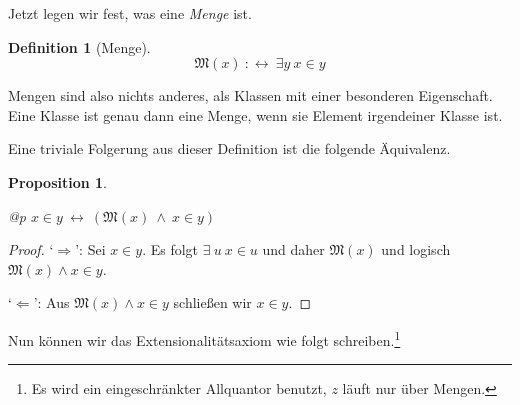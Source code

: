 \documentclass[a4paper,german,10pt,twoside]{book}
\newtheorem{prop}[thm]{Proposition}
\theoremstyle{definition}
\newtheorem{defn}[thm]{Definition}
\theoremstyle{remark}
\begin{document}
\par
Jetzt legen wir fest, was eine \emph{Menge} ist.

\begin{defn}[Menge]
\label{definition:isSet} \hypertarget{definition:isSet}{}
$$\mathfrak{M}(x)\ :\leftrightarrow \ \exists y\ x \in y$$

\end{defn}

Mengen sind also nichts anderes, als Klassen mit einer besonderen Eigenschaft. Eine Klasse ist genau dann eine Menge, wenn sie Element irgendeiner Klasse ist.


\par
Eine triviale Folgerung aus dieser Definition ist die folgende {\"A}quivalenz.

\begin{prop}
\label{theorem:inSetEqualInSetAndIsSet} \hypertarget{theorem:inSetEqualInSetAndIsSet}{}
\mbox{}
\begin{longtable}{{@{\extracolsep{\fill}}p{\linewidth}}}
\centering $x \in y\ \leftrightarrow \ (\mathfrak{M}(x)\ \land \ x \in y)$
\end{longtable}

\end{prop}
\begin{proof}
`$\Rightarrow$': Sei $x \in y$. Es folgt $\exists \ u \ x \in u$ und daher $\mathfrak{M}(x)$ und logisch $\mathfrak{M}(x) \land x \in y$.

\par
`$\Leftarrow$': Aus $\mathfrak{M}(x) \land x \in y$ schlie{\ss}en wir $x \in y$.
\end{proof}




\par
Nun k{\"o}nnen wir das Extensionalit{\"a}tsaxiom wie folgt schreiben.\footnote{Es wird ein eingeschr{\"a}nkter Allquantor benutzt, $z$ l{\"a}uft nur {\"u}ber Mengen.}
\end{document}
